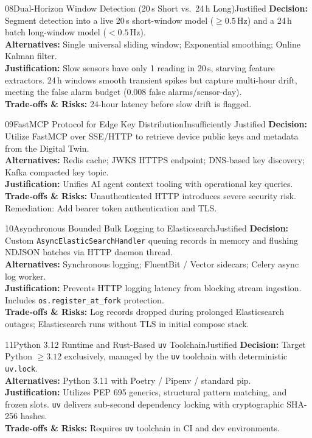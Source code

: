 \documentclass[10pt,a4paper]{report}
\begin{document}
\begin{adrbox}{08}{Dual-Horizon Window Detection (20\,s Short vs.\ 24\,h Long)}{Justified}
\textbf{Decision:} Segment detection into a live 20\,s short-window model ($\ge 0.5$\,Hz) and a 24\,h batch long-window model ($< 0.5$\,Hz).\\
\textbf{Alternatives:} Single universal sliding window; Exponential smoothing; Online Kalman filter.\\
\textbf{Justification:} Slow sensors have only 1 reading in 20\,s, starving feature extractors. 24\,h windows smooth transient spikes but capture multi-hour drift, meeting the false alarm budget (0.008 false alarms/sensor-day).\\
\textbf{Trade-offs \& Risks:} 24-hour latency before slow drift is flagged.
\end{adrbox}

\begin{adrbox}{09}{FastMCP Protocol for Edge Key Distribution}{Insufficiently Justified}
\textbf{Decision:} Utilize FastMCP over SSE/HTTP to retrieve device public keys and metadata from the Digital Twin.\\
\textbf{Alternatives:} Redis cache; JWKS HTTPS endpoint; DNS-based key discovery; Kafka compacted key topic.\\
\textbf{Justification:} Unifies AI agent context tooling with operational key queries.\\
\textbf{Trade-offs \& Risks:} Unauthenticated HTTP introduces severe security risk. Remediation: Add bearer token authentication and TLS.
\end{adrbox}

\begin{adrbox}{10}{Asynchronous Bounded Bulk Logging to Elasticsearch}{Justified}
\textbf{Decision:} Custom \texttt{AsyncElasticSearchHandler} queuing records in memory and flushing NDJSON batches via HTTP daemon thread.\\
\textbf{Alternatives:} Synchronous logging; FluentBit / Vector sidecars; Celery async log worker.\\
\textbf{Justification:} Prevents HTTP logging latency from blocking stream ingestion. Includes \lstinline{os.register_at_fork} protection.\\
\textbf{Trade-offs \& Risks:} Log records dropped during prolonged Elasticsearch outages; Elasticsearch runs without TLS in initial compose stack.
\end{adrbox}

\begin{adrbox}{11}{Python 3.12 Runtime and Rust-Based \texttt{uv} Toolchain}{Justified}
\textbf{Decision:} Target Python $\ge 3.12$ exclusively, managed by the \texttt{uv} toolchain with deterministic \texttt{uv.lock}.\\
\textbf{Alternatives:} Python 3.11 with Poetry / Pipenv / standard pip.\\
\textbf{Justification:} Utilizes PEP 695 generics, structural pattern matching, and frozen slots. \texttt{uv} delivers sub-second dependency locking with cryptographic SHA-256 hashes.\\
\textbf{Trade-offs \& Risks:} Requires \texttt{uv} toolchain in CI and dev environments.
\end{adrbox}
\end{document}
